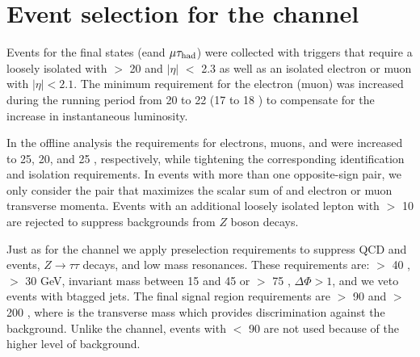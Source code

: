 \section{\texorpdfstring{Event selection for the \leptonTau channel}{Event selection for the lepton-tau channel}}
\label{sect:eleTauCuts}
Events for the \leptonTau final states (e\Tau and $\mu\tau_{\rm had}$)
were collected with triggers that require 
a loosely isolated \Tau with \PT $>$ 20 \GeV and $|\eta|$ $<$ 2.3 as well as
an isolated electron or muon with $|\eta| < 2.1$.  The minimum
\PT requirement for the electron (muon) was increased during the running
period from 20 to 22 \GeV (17 to 18 \GeV)
to compensate for the increase in instantaneous luminosity.

In the offline analysis the \PT requirements for electrons, muons, and \Tau were increased to 25, 20, and 25 \GeV, respectively, while tightening the corresponding identification and isolation requirements.
In events with more than one opposite-sign \leptonTau pair, we only consider
 the pair that maximizes the scalar sum of \Tau and electron or muon 
transverse momenta.  Events with an additional loosely isolated lepton
with \PT $>$ 10 \GeV are rejected to suppress backgrounds from $Z$ boson
decays.  

Just as for the \Tau\Tau channel we apply preselection requirements to suppress
QCD and \ttbar events, $Z \to \tau \tau$ decays, and low mass resonances.
These requirements are: \mttwo $>$ 40 \GeV, \MET $>$ 30 GeV, \leptonTau 
invariant mass between 15 and 45 \GeV or $>$ 75 \GeV, $\Delta \Phi > 1$, and we veto events with btagged jets.
The final signal region requirements are \mttwo $>$ 90 \GeV and 
\tauMT $>$ 200 \GeV, where \tauMT is the \Tau transverse mass which provides
discrimination against the \wjets background.  Unlike the \tauTau channel,
events with \mttwo $<$ 90 \GeV are not used because of the higher 
level of background.




